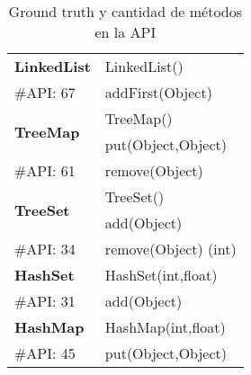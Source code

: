 \begin{table}[t!]
{\begin{tabular}{l l}
\hline

\multirow{1}{*}{\textbf{LinkedList}} 
 & LinkedList() \\
 {\scriptsize \#API: 67} & addFirst(Object)  \\
 \hline

\multirow{2}{*}{\textbf{TreeMap}} 
 & TreeMap() \\
 & put(Object,Object) \\
{\scriptsize \#API: 61} & remove(Object) \\
\hline

\multirow{2}{*}{\textbf{TreeSet}} 
 & TreeSet() \\
 & add(Object) \\
{\scriptsize \#API: 34} & remove(Object) (int) \\
\hline

\multirow{1}{*}{\textbf{HashSet}} 
 & HashSet(int,float) \\
 {\scriptsize \#API: 31} & add(Object) \\
\hline

\multirow{1}{*}{\textbf{HashMap}} 
 & HashMap(int,float)  \\
{\scriptsize \#API: 45} & put(Object,Object)  \\
\hline

\end{tabular}%
}
\caption{Ground truth y cantidad de métodos en la API}
\label{tab:groundTruth}
\end{table}

